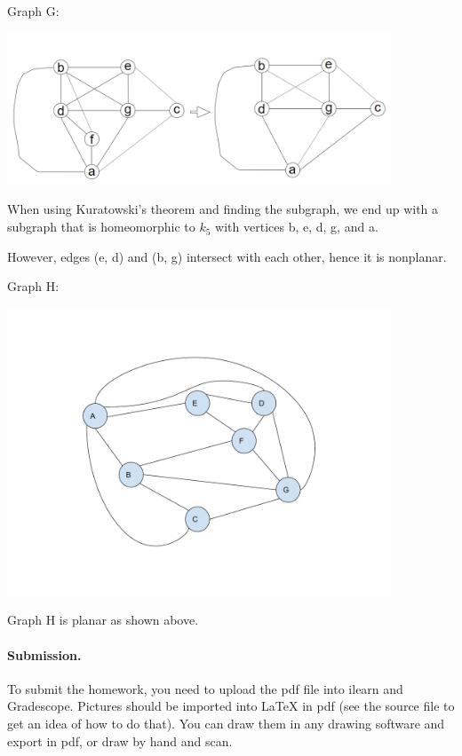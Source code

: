 \documentclass{article}
\begin{document}
\begin{solution}
Graph G:
\begin{center}
\includegraphics[width=4.5in]{HW5_pics/HW5Solution4a.PNG}
\end{center}

When using Kuratowski's theorem and finding the subgraph, we end up with a subgraph that is homeomorphic to $k_5$ with vertices b, e, d, g, and a.
\newline

However, edges (e, d) and (b, g) intersect with each other, hence it is nonplanar.
\newline

Graph H: 
\begin{center}
\includegraphics[width=4.5in]{HW5_pics/HW5Solution4.pdf}
\end{center}

Graph H is planar as shown above.


\end{solution}



\vskip 0.1in
\paragraph{Submission.}
To submit the homework, you need to upload the pdf file into ilearn and Gradescope.
Pictures should be imported into {\LaTeX} in pdf (see the source file to get an idea of how to do that). You can draw them in any drawing software and export in pdf, or draw by hand and scan.
\end{document}
